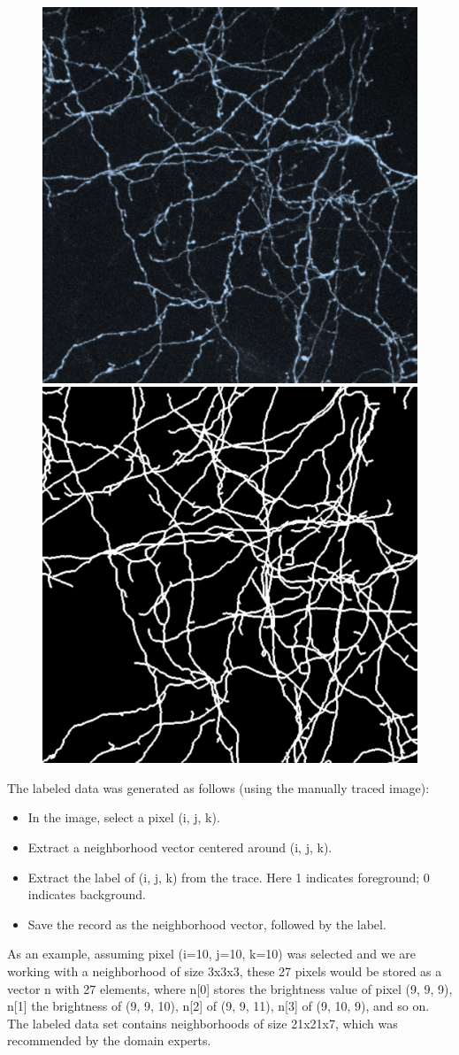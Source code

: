 \documentclass{neu_handout}
\begin{document}
\begin{figure}[h]
\centering
{
\includegraphics[width=0.2\linewidth]{image1}
\label{fig:left}
}
{
\includegraphics[width=0.2\linewidth]{image2}
\label{fig:right}
}
\end{figure}


The labeled data was generated as follows (using the manually traced image):
\newenvironment{myitemize}
{ \begin{itemize}
    \setlength{\itemsep}{0pt}
    \setlength{\parskip}{0pt}
    \setlength{\parsep}{0pt}     }
{ \end{itemize}                  } 

\begin{myitemize}
  \item In the image, select a pixel (i, j, k).
  \item Extract a neighborhood vector centered around (i, j, k).
  \item Extract the label of (i, j, k) from the trace. Here 1 indicates foreground; 0 indicates background.
  \item  Save the record as the neighborhood vector, followed by the label.
\end{myitemize}

As an example, assuming pixel (i=10, j=10, k=10) was selected and we are working with a neighborhood of size 3x3x3, these 27 pixels would be stored as a vector n with 27 elements, where n[0] stores the brightness value of
pixel (9, 9, 9), n[1] the brightness of (9, 9, 10), n[2] of (9, 9, 11), n[3] of (9, 10, 9), and so on. The labeled data set contains neighborhoods of size 21x21x7, which was recommended by the domain experts.\\
\end{document}
